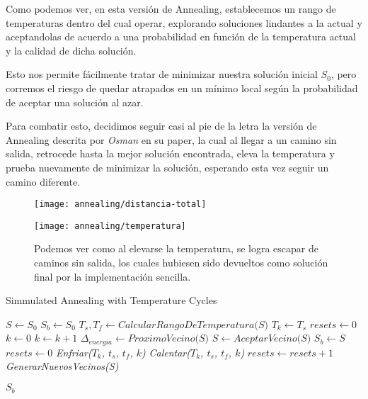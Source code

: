 Como podemos ver, en esta versión de Annealing, establecemos un rango de temperaturas dentro del cual operar, explorando soluciones lindantes a la actual y aceptandolas de acuerdo a una probabilidad en función de la temperatura actual y la calidad de dicha solución.


Esto nos permite fácilmente tratar de minimizar nuestra solución inicial $S_0$, pero corremos el riesgo de quedar atrapados en un mínimo local según la probabilidad de aceptar una solución al azar.

Para combatir esto, decidimos seguir casi al pie de la letra la versión de Annealing descrita por \textit{Osman} en su paper, la cual al llegar a un camino sin salida, retrocede hasta la mejor solución encontrada, eleva la temperatura y prueba nuevamente de minimizar la solución, esperando esta vez seguir un camino diferente.


\begin{figure}[H]
	\centering
	\begin{minipage}[t]{.45\textwidth}
		\centering
		\texttt{[image: annealing/distancia-total]}
	\end{minipage}\qquad
	\begin{minipage}[t]{.45\textwidth}
		\centering
		\texttt{[image: annealing/temperatura]}
	\end{minipage}
	
	Podemos ver como al elevarse la temperatura, se logra escapar de caminos sin salida, los cuales hubiesen sido devueltos como solución final por la implementación sencilla.
\end{figure}	


\begin{algorithm}[H]
\caption{Simmulated Annealing with Temperature Cycles}
\begin{algorithmic}[1]
\State $S \gets S_0$ 
\State $S_b \gets S_0$ 
\State $T_s, T_f  \gets \textit{CalcularRangoDeTemperatura(S)}$
\State $T_k \gets T_{s}$ 
\State $resets \gets 0$ 
\State $k \gets 0$
\State
{} 
	\State $k \gets k + 1$ 
	\State
		\State $\Delta_{energia} \gets \textit{ProximoVecino(S)}$ 
			\State $S \gets \textit{AceptarVecino(S)}$ 
		\EndIf
			\State $S_b \gets S$ 
			\State $resets \gets 0$ 
		\EndIf	
		\State \textit{Enfriar($T_k$, $t_s$, $t_f$, $k$)}	
		\State
	\Else
		\State \textit{Calentar($T_k$, $t_s$, $t_f$, $k$)} 		
		\State $resets \gets resets + 1$ 
		\State \textit{GenerarNuevosVecinos(S)} 
	\EndIf

\EndWhile
\State
\State \Return $S_b$ 
\EndFunction
\end{algorithmic}
\end{algorithm}

